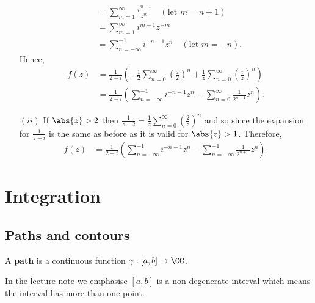 \documentclass[12pt, a4paper]{article}
\begin{document}
\begin{example}
\begin{solution}
\begin{enumerate}
\[\begin{aligned}
                &= \sum_{m=1}^{\infty} \frac{i^{m-1}}{z^m} \quad (\text{let } m=n+1) \\
                &= \sum_{m=1}^{\infty} i^{m-1} z^{-m} \\
                &= \sum_{n=-\infty}^{-1} i^{-n-1} z^n \quad (\text{let } m=-n). 
            \end{aligned}\]
            Hence, 
            \[\begin{aligned}
                f(z) &= \frac{1}{2-i}\left( -\frac{1}{2} \sum_{n=0}^{\infty} \left( \frac{z}{2} \right)^n + \frac{1}{z} \sum_{n=0}^{\infty} \left( \frac{i}{z} \right)^n \right) \\
                &= \frac{1}{2-i}\left( \sum_{n = -\infty}^{-1} i^{-n-1} z^n - \sum_{n=0}^{\infty} \frac{1}{2^{n+1}} z^n \right).
            \end{aligned}\]
            \item[\((ii)\)] If \(\abs{z}>2\) then \(\frac{1}{z-2} = \frac{1}{z} \sum_{n=0}^{\infty} \left( \frac{2}{z} \right)^n\) and so since the expansion for \(\frac{1}{z-i}\) is the same as before as it is valid for \(\abs{z}>1\). Therefore,
            \[\begin{aligned}
                f(z) &= \frac{1}{2-i} \left( \sum_{n = -\infty}^{-1} i^{-n-1} z^n - \sum_{n=-\infty}^{-1} \frac{1}{2^{n+1}} z^n \right).
            \end{aligned}\]
        \end{enumerate}
    \end{solution}
\end{example}

\section{Integration}

\subsection{Paths and contours}

\begin{definition}
    A \textbf{path} is a continuous function \(\gamma : [a,b] \to \CC\).
\end{definition}

\begin{mdnote}
    In the lecture note we emphasise \([a,b]\) is a non-degenerate interval which means the interval has more than one point.
\end{mdnote}
\end{document}

